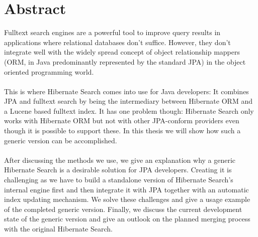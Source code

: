 \section*{Abstract}

Fulltext search engines are a powerful tool to improve query results in applications where relational databases don't suffice. However, they don't integrate well with the widely spread concept of object relationship mappers (ORM, in Java predominantly represented by the standard JPA) in the object oriented programming world.
\\\\
This is where Hibernate Search comes into use for Java developers: It combines JPA and fulltext search by being the intermediary between Hibernate ORM and a Lucene based fulltext index. It has one problem though: Hibernate Search only works with Hibernate ORM but not with other JPA-conform providers even though it is possible to support these. In this thesis we will show how such a generic version can be accomplished.
\\\\
After discussing the methods we use, we give an explanation why a generic Hibernate Search is a desirable solution for JPA developers. Creating it is challenging as we have to build a standalone version of Hibernate Search's internal engine first and then integrate it with JPA together with an automatic index updating mechanism. We solve these challenges and give a usage example of the completed generic version. Finally, we discuss the current development state of the generic version and give an outlook on the planned merging process with the original Hibernate Search.

\pagebreak

